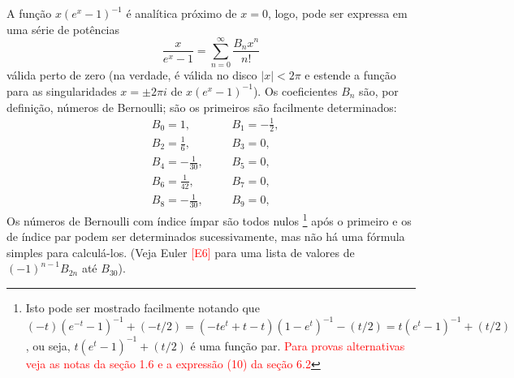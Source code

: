     
    A função $x(e^x - 1)^{-1}$ é analítica próximo de $x = 0$, logo, pode ser expressa em uma série de potências
    \begin{equation}
        \label{xexp-serie-pot}
        \frac{x}{e^x - 1} = \sum_{n=0}^{\infty} \frac{B_n x^n}{n!}
    \end{equation}
    válida perto de zero (na verdade, é válida no disco $|x| < 2\pi$ e estende a função para as singularidades $x = \pm 2\pi i$ de $x(e^x - 1)^{-1}$). Os coeficientes $B_n$ são, por definição, números de Bernoulli; são os primeiros são facilmente determinados:
    \begin{align*}
        &B_0 = 1, \ \ \ \ &&B_1 = -\frac{1}{2}, \\
        &B_2 = \frac{1}{6}, \ \ \ \ &&B_3 = 0, \\
        &B_4 = -\frac{1}{30}, \ \ \ \ &&B_5 = 0, \\
        &B_6 = \frac{1}{42}, \ \ \ \ &&B_7 = 0, \\
        &B_8 = -\frac{1}{30}, \ \ \ \ &&B_9 = 0, 
    \end{align*}
    Os números de Bernoulli com índice ímpar são todos nulos
    \footnote{ Isto pode ser mostrado facilmente notando que $(-t)(e^{-t} - 1)^{-1} + (-t/2) = (-te^t + t - t)(1 - e^t)^{-1} - (t/2) = t(e^t - 1)^{-1} + (t/2)$, ou seja, $t(e^t - 1)^{-1} + (t/2)$ é uma função par. \textcolor{red}{Para provas alternativas veja as notas da seção 1.6 e a expressão (10) da seção 6.2}
    } 
    após o primeiro e os de índice par podem ser determinados sucessivamente, mas não há uma fórmula simples para calculá-los. (Veja Euler \textcolor{red}{[E6]} para uma lista de valores de $(-1)^{n-1}B_{2n}$ até $B_{30}$).
    

